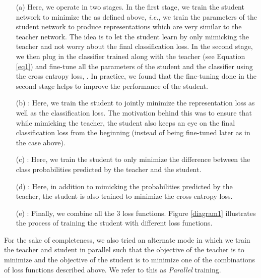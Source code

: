 \documentclass[10pt,twocolumn,letterpaper]{article}
\begin{document}
\begin{enumerate}
\item[(a)]  Here, we operate in two stages. In the first stage, we train the student network to minimize the  as defined above, \textit{i.e.}, we train the parameters of the student network to produce representations which are very similar to the teacher network. The idea is to let the student learn by only mimicking the teacher and not worry about the final classification loss. In the second stage, we then plug in the classifier trained along with the teacher (see Equation \ref{eq1}) and fine-tune all the parameters of the student and the classifier using the cross entropy loss, . In practice, we found that the fine-tuning done in the second stage helps to improve the performance of the student. 

\item[(b)] : Here, we train the student to jointly minimize the representation loss as well as the classification loss. The motivation behind this was to ensure that while mimicking the teacher, the student also keeps an eye on the final classification loss from the beginning (instead of being fine-tuned later as in the case above). \item[(c)] : Here, we train the student to only minimize the difference between the class probabilities predicted by the teacher and the student. 

\item[(d)] : Here, in addition to mimicking the probabilities predicted by the teacher, the student is also trained to minimize the cross entropy loss.

\item[(e)] : Finally, we combine all the 3 loss functions. Figure \ref{diagram1} illustrates the process of training the student with different loss functions. \end{enumerate}

For the sake of completeness, we also tried an alternate mode in which we train the teacher and student in parallel such that the objective of the teacher is to minimize  and the objective of the student is to minimize one of the  combinations of loss functions described above. We refer to this as \textit{Parallel} training.
\end{document}
